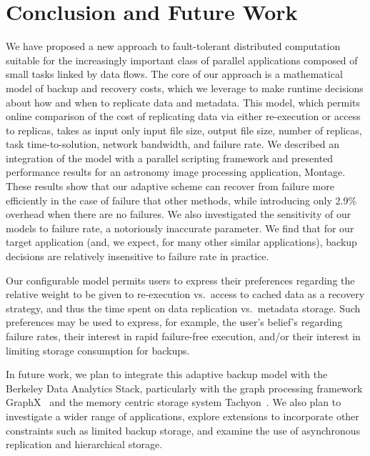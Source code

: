 \documentclass{sig-alternate}
\begin{document}
\section{Conclusion and Future Work}
\label{sec:Con}
We have proposed a new approach to fault-tolerant distributed computation suitable for the increasingly important class of parallel applications composed of small tasks linked by data flows.
The core of our approach is a mathematical model of backup and recovery costs, which we leverage to make runtime decisions about how and when to replicate data and metadata. This model, which permits online comparison of the cost of replicating data via either re-execution or access to replicas, takes as input only input file size, output file size, number of replicas, task time-to-solution, network bandwidth, and failure rate.
We described an integration of the model with a parallel scripting framework and presented performance results for an astronomy image processing application, Montage.
These results show that our adaptive scheme can recover from failure more efficiently in the case of failure that other methods, while introducing only 2.9\% overhead when there are no failures. We also investigated the sensitivity of our models to failure rate, a notoriously inaccurate parameter. We find that for our target application (and, we expect, for many other similar applications), backup decisions are relatively insensitive to failure rate in practice.

Our configurable model permits users to express their preferences regarding the relative weight to be given to re-execution vs.\ access to cached data as a recovery strategy,
and thus the time spent on data replication vs.\ metadata storage. Such preferences may be used to express, for example, the user's belief's regarding failure rates, their interest
in rapid failure-free execution, and/or their interest in limiting storage consumption for backups.

In future work, we plan to integrate this adaptive backup model with the Berkeley Data Analytics Stack, particularly with
the graph processing framework GraphX~\cite{graphx2014} and the memory centric storage system Tachyon~\cite{tachyon2014}.
We also plan to investigate a wider range of applications, explore extensions to incorporate other constraints such as limited backup storage,
and examine the use of asynchronous replication and hierarchical storage.

{\footnotesize 
}


\end{document}
